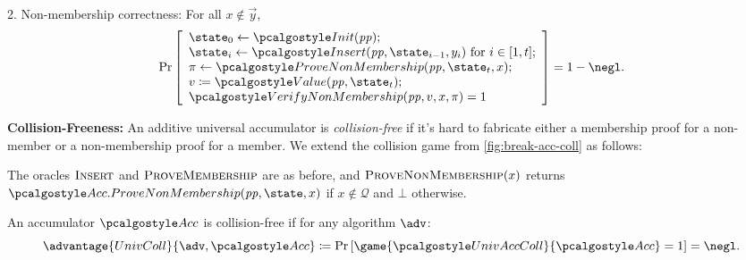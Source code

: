\begin{mysolution}
  2. Non-membership correctness: For all $x \notin \vec{y}$,
  \[
    \Pr\left[
    \begin{array}{l}
      \state_0 \gets \algo{Init}(\params); \\
      \state_i \gets \algo{Insert}(\params, \state_{i-1}, y_i) \text{ for } i \in [1, t]; \\
      \pi \gets \algo{ProveNonMembership}(\params, \state_t, x); \\
      v \defeq \algo{Value}(\params, \state_t); \\
      \algo{VerifyNonMembership}(\params, v, x, \pi) = 1
    \end{array}
    \right] = 1 - \negl.
  \]
  
  \textbf{Collision-Freeness:} An additive universal accumulator is \emph{collision-free} if it's hard to fabricate either a membership proof for a non-member or a non-membership proof for a member.
  We extend the collision game from \autoref{fig:break-acc-coll} as follows:
  
  \begin{center}
    \begin{tcolorbox}[width=13cm]
      \begin{pcvstack}[center]
      \end{pcvstack}
    \end{tcolorbox}
  \end{center}
  
  The oracles ${\normalfont\textsc{Insert}}$ and ${\normalfont\textsc{ProveMembership}}$ are as before, and ${\normalfont\textsc{ProveNonMembership}}(x)$ returns $\algo{Acc.ProveNonMembership}(\params, \state, x)$ if $x \notin \mathcal{Q}$ and $\bot$ otherwise.
  
  An accumulator $\algo{Acc}$ is collision-free if for any \ppt algorithm $\adv$:
  \[
    \advantage{UnivColl}{\adv, \algo{Acc}} \defeq \pr{\game{\algo{UnivAccColl}}{\algo{Acc}} = 1} = \negl.
  \]
\end{mysolution}
\fi

